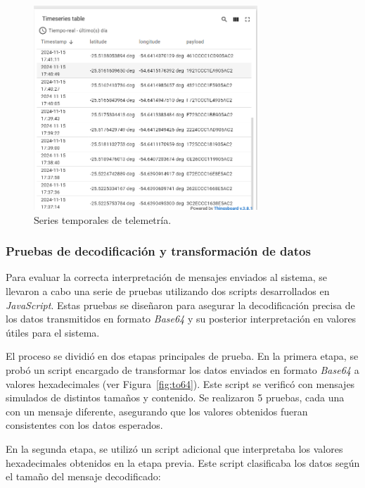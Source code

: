 \begin{figure}[H]
\leavevmode
\begin{minipage}{\textwidth}
\begin{center}
\includegraphics[width=0.75\textwidth]{./capitulo_05/imagen/resmon/timeserie.png}
\caption{Series temporales de telemetría.\label{fig:tempser}}
\end{center}
\end{minipage}
\end{figure}
\subsubsection{Pruebas de decodificación y transformación de datos}

Para evaluar la correcta interpretación de mensajes enviados al sistema, se llevaron a cabo una serie de pruebas utilizando dos scripts desarrollados en \textit{JavaScript}. Estas pruebas se diseñaron para asegurar la decodificación precisa de los datos transmitidos en formato \textit{Base64} y su posterior interpretación en valores útiles para el sistema.

El proceso se dividió en dos etapas principales de prueba. En la primera etapa, se probó un script encargado de transformar los datos enviados en formato \textit{Base64} a valores hexadecimales (ver Figura~\ref{fig:to64}). Este script se verificó con mensajes simulados de distintos tamaños y contenido. Se realizaron 5 pruebas, cada una con un mensaje diferente, asegurando que los valores obtenidos fueran consistentes con los datos esperados.

En la segunda etapa, se utilizó un script adicional que interpretaba los valores hexadecimales obtenidos en la etapa previa. Este script clasificaba los datos según el tamaño del mensaje decodificado:

